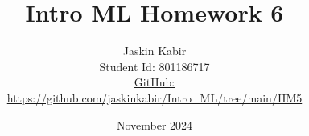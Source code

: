 \title{\Huge Intro ML Homework 6}

\author{ \huge
Jaskin Kabir \\
\Large Student Id: 801186717 \\
\Large \href{https://github.com/jaskinkabir/Intro_ML/tree/main/HM5}{GitHub:}\\\url{https://github.com/jaskinkabir/Intro_ML/tree/main/HM5}
}

\date{November 2024}

\begin{titlingpage}
\maketitle
\end{titlingpage}